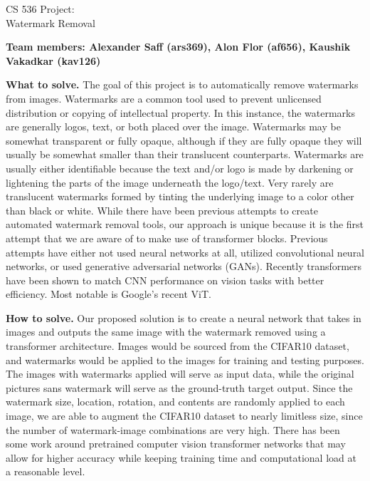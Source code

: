 \documentclass[11pt]{article}
\begin{document}
\begin{center}
\large{CS 536 Project:\\Watermark Removal}\\
\end{center}
\vspace{5mm}

\textbf{Team members: Alexander Saff (ars369), Alon Flor (af656), Kaushik Vakadkar (kav126)}




\begin{sloppypar}
\textbf{What to solve.}
The goal of this project is to automatically remove watermarks from images. Watermarks are a common tool used to prevent unlicensed distribution or copying of intellectual property. In this instance, the watermarks are generally logos, text, or both placed over the image. Watermarks may be somewhat transparent or fully opaque, although if they are fully opaque they will usually be somewhat smaller than their translucent counterparts. Watermarks are usually either identifiable because the text and/or logo is made by darkening or lightening the parts of the image underneath the logo/text. Very rarely are translucent watermarks formed by tinting the underlying image to a color other than black or white. While there have been previous attempts to create automated watermark removal tools, our approach is unique because it is the first attempt that we are aware of to make use of transformer blocks. Previous attempts have either not used neural networks at all, utilized convolutional neural networks, or used generative adversarial networks (GANs). Recently transformers have been shown to match CNN performance on vision tasks with better efficiency. Most notable is Google’s recent ViT\cite{dosovitskiy2020image}.
\end{sloppypar}

\begin{sloppypar}
\textbf{How to solve.} 
Our proposed solution is to create a neural network that takes in images and outputs the same image with the watermark removed using a transformer architecture. Images would be sourced from the CIFAR10 dataset, and watermarks would be applied to the images for training and testing purposes. The images with watermarks applied will serve as input data, while the original pictures sans watermark will serve as the ground-truth target output. Since the watermark size, location, rotation, and contents are randomly applied to each image, we are able to augment the CIFAR10 dataset to nearly limitless size, since the number of watermark-image combinations are very high. There has been some work around pretrained computer vision transformer networks that may allow for higher accuracy while keeping training time and computational load at a reasonable level.
\end{sloppypar}
\end{document}
